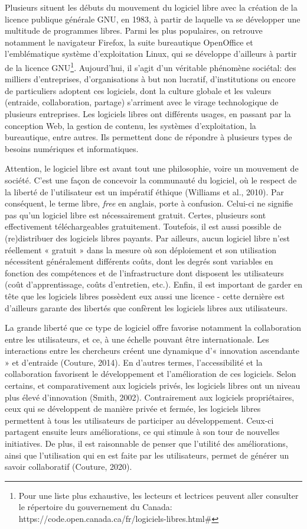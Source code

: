 \documentclass[
  letterpaper,
  DIV=11,
  numbers=noendperiod]{scrreprt}
\begin{document}
Plusieurs situent les débuts du mouvement du logiciel libre avec la
création de la licence publique générale GNU, en 1983, à partir de
laquelle va se développer une multitude de programmes libres. Parmi les
plus populaires, on retrouve notamment le navigateur Firefox, la suite
bureautique OpenOffice et l'emblématique système d'exploitation Linux,
qui se développe d'ailleurs à partir de la licence GNU\footnote{Pour une
  liste plus exhaustive, les lecteurs et lectrices peuvent aller
  consulter le répertoire du gouvernement du Canada:
  https://code.open.canada.ca/fr/logiciels-libres.html\#}. Aujourd'hui,
il s'agit d'un véritable phénomène sociétal: des milliers d'entreprises,
d'organisations à but non lucratif, d'institutions ou encore de
particuliers adoptent ces logiciels, dont la culture globale et les
valeurs (entraide, collaboration, partage) s'arriment avec le virage
technologique de plusieurs entreprises. Les logiciels libres ont
différents usages, en passant par la conception Web, la gestion de
contenu, les systèmes d'exploitation, la bureautique, entre autres. Ils
permettent donc de répondre à plusieurs types de besoins numériques et
informatiques.

Attention, le logiciel libre est avant tout une philosophie, voire un
mouvement de société. C'est une façon de concevoir la communauté du
logiciel, où le respect de la liberté de l'utilisateur est un impératif
éthique (Williams et al., 2010). Par conséquent, le terme libre,
\emph{free} en anglais, porte à confusion. Celui-ci ne signifie pas
qu'un logiciel libre est nécessairement gratuit. Certes, plusieurs sont
effectivement téléchargeables gratuitement. Toutefois, il est aussi
possible de (re)distribuer des logiciels libres payants. Par ailleurs,
aucun logiciel libre n'est réellement « gratuit » dans la mesure où son
déploiement et son utilisation nécessitent généralement différents
coûts, dont les degrés sont variables en fonction des compétences et de
l'infrastructure dont disposent les utilisateurs (coût d'apprentissage,
coûts d'entretien, etc.). Enfin, il est important de garder en tête que
les logiciels libres possèdent eux aussi une licence - cette dernière
est d'ailleurs garante des libertés que confèrent les logiciels libres
aux utilisateurs.

La grande liberté que ce type de logiciel offre favorise notamment la
collaboration entre les utilisateurs, et ce, à une échelle pouvant être
internationale. Les interactions entre les chercheurs créent une
dynamique d'« innovation ascendante » et d'entraide (Couture, 2014). En
d'autres termes, l'accessibilité et la collaboration favorisent le
développement et l'amélioration de ces logiciels. Selon certains, et
comparativement aux logiciels privés, les logiciels libres ont un niveau
plus élevé d'innovation (Smith, 2002). Contrairement aux logiciels
propriétaires, ceux qui se développent de manière privée et fermée, les
logiciels libres permettent à tous les utilisateurs de participer au
développement. Ceux-ci partagent ensuite leurs améliorations, ce qui
stimule à son tour de nouvelles initiatives. De plus, il est raisonnable
de penser que l'utilité des améliorations, ainsi que l'utilisation qui
en est faite par les utilisateurs, permet de générer un savoir
collaboratif (Couture, 2020).
\end{document}
